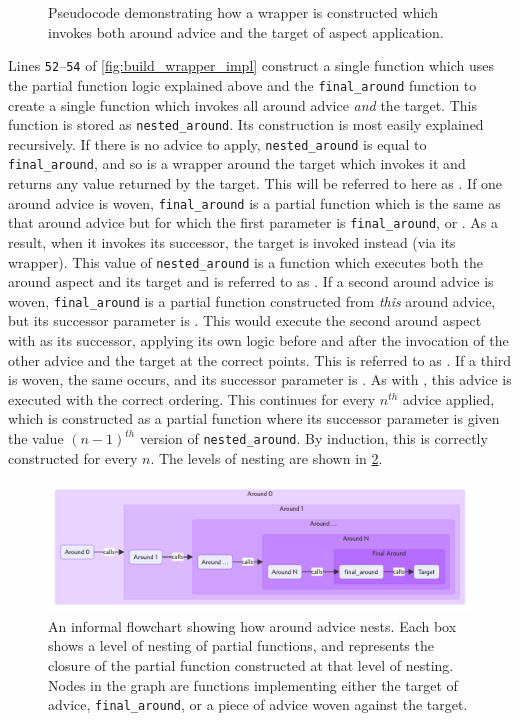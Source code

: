 \begin{figure}
\centering

\caption{Pseudocode demonstrating how a wrapper is constructed which invokes both around advice and the target of aspect application.}
\label{fig:final_around_pseudocode}
\end{figure}

Lines \texttt{52}--\texttt{54} of \cref{fig:build_wrapper_impl} construct a
single function which uses the partial function logic explained above and the
\lstinline{final_around} function to create a single function which invokes all
around advice \emph{and} the target. This function is stored as
\lstinline{nested_around}. Its construction is most easily explained
recursively. If there is no advice to apply, \lstinline{nested_around} is equal
to \lstinline{final_around}, and so is a wrapper around the target which invokes
it and returns any value returned by the target. This will be referred to here
as . If one around advice is woven, \lstinline{final_around} is a
partial function which is the same as that around advice but for which the first
parameter is \lstinline{final_around}, or . As a result, when it
invokes its successor, the target is invoked instead (via its wrapper). This
value of \lstinline{nested_around} is a function which executes both the around
aspect and its target and is referred to as . If a second around
advice is woven, \lstinline{final_around} is a partial function constructed from
\emph{this} around advice, but its successor parameter is . This
would execute the second around aspect with  as its successor,
applying its own logic before and after the invocation of the other advice and
the target at the correct points. This is referred to as . If a third
is woven, the same occurs, and its successor parameter is . As with
, this advice is executed with the correct ordering. This continues
for every $n^{th}$ advice applied, which is constructed as a partial function
where its successor parameter is given the value $(n-1)^{th}$ version of
\lstinline{nested_around}. By induction, this is correctly constructed for every
$n$.
The levels of nesting are shown in \cref{fig:levels_of_nesting_arounds}.
\begin{figure}
\centering
\includegraphics[width=\columnwidth]{40_pydysofu_rewrite/diagrams/nesting_of_around_advice.pdf}
\caption{An informal flowchart showing how around advice nests. Each box shows a
level of nesting of partial functions, and represents the closure of the partial
function constructed at that level of nesting. Nodes in the graph are functions
implementing either the target of advice, \lstinline{final_around}, or a piece
of advice woven against the target.}
\label{fig:levels_of_nesting_arounds}
\end{figure}
